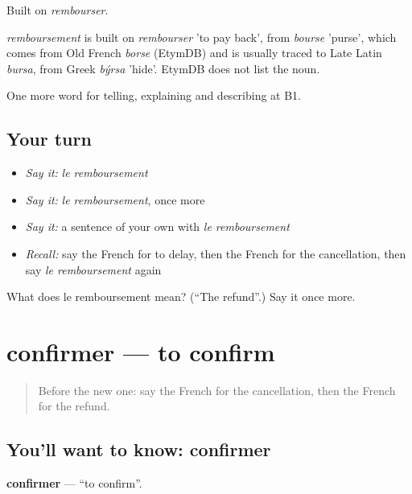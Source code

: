 Built on \emph{rembourser}.

\begin{cousinweb}
\emph{remboursement} is built on \emph{rembourser} 'to pay back', from \emph{bourse} 'purse', which comes from Old French \emph{borse} (EtymDB) and is usually traced to Late Latin \emph{bursa}, from Greek \emph{býrsa} 'hide'. EtymDB does not list the noun.
\end{cousinweb}

\begin{grammarlens}[title={What you've built}]
One more word for telling, explaining and describing at B1.
\end{grammarlens}

\subsection*{Your turn}
\begin{itemize}
\raggedright
  \item \emph{Say it:} \emph{le remboursement}
  \item \emph{Say it:} \emph{le remboursement}, once more
  \item \emph{Say it:} a sentence of your own with \emph{le remboursement}
  \item \emph{Recall:} say the French for to delay, then the French for the cancellation, then say \emph{le remboursement} again
\end{itemize}

\begin{tcolorbox}[breakable,colback=teal!4,colframe=teal!35!black,title={Before you move on}]
What does le remboursement mean? (\textquotedblleft{}The refund\textquotedblright{}.) Say it once more.
\end{tcolorbox}
\section[confirmer]{confirmer — to confirm}

\label{lesson:FR-C421-confirmer}



\begin{quote}
Before the new one: say the French for the cancellation, then the French for the refund.
\end{quote}

\subsection*{You'll want to know: confirmer}
\textbf{confirmer} — \textquotedblleft{}to confirm\textquotedblright{}.


